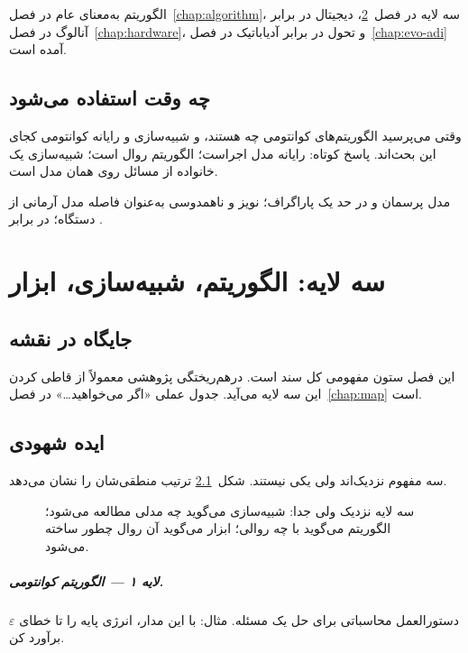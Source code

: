 الگوریتم به‌معنای عام در فصل~\ref{chap:algorithm}، سه لایه در فصل~\ref{chap:three-layers}، دیجیتال در برابر آنالوگ در فصل~\ref{chap:hardware}، و تحول در برابر آدیاباتیک در فصل~\ref{chap:evo-adi} آمده است.

\section{چه وقت استفاده می‌شود}

وقتی می‌پرسید الگوریتم‌های کوانتومی چه هستند، و شبیه‌سازی و رایانه کوانتومی کجای این بحث‌اند. پاسخ کوتاه: رایانه مدل اجراست؛ الگوریتم روال است؛ شبیه‌سازی یک خانواده از مسائل روی همان مدل است.

\begin{remark}
مدل پرسمان و  در حد یک پاراگراف؛ نویز و ناهمدوسی به‌عنوان فاصله مدل آرمانی از دستگاه؛  در برابر .
\end{remark}

\chapter{سه لایه: الگوریتم، شبیه‌سازی، ابزار}
\label{chap:three-layers}

\section{جایگاه در نقشه}

این فصل ستون مفهومی کل سند است. درهم‌ریختگی پژوهشی معمولاً از قاطی کردن این سه لایه می‌آید. جدول عملی «اگر می‌خواهید\ldots» در فصل~\ref{chap:map} است.

\section{ایده شهودی}

سه مفهوم نزدیک‌اند ولی یکی نیستند. شکل~\ref{fig:three-layers} ترتیب منطقی‌شان را نشان می‌دهد.

\begin{figure}[htbp]
	\centering
	\begin{latin}
			
		\end{latin}
	\caption{سه لایه نزدیک ولی جدا: شبیه‌سازی می‌گوید چه مدلی مطالعه می‌شود؛ الگوریتم می‌گوید با چه روالی؛ ابزار می‌گوید آن روال چطور ساخته می‌شود.}
	\label{fig:three-layers}
\end{figure}

\paragraph{لایه ۱ --- الگوریتم کوانتومی.}
دستورالعمل محاسباتی برای حل یک مسئله. مثال: با این مدار، انرژی پایه را تا خطای $\varepsilon$ برآورد کن.

